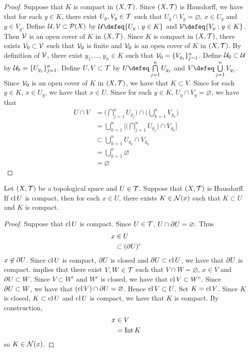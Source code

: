 \documentclass{book}
\begin{document}
	\begin{proof}
		Suppose that $K$ is compact in $(X, \mathcal{T})$. Since $(X, \mathcal{T})$ is Hausdorff, we have that for each $y \in K$, there exist $U_y, V_y \in \mathcal{T}$ such that $U_y \cap V_y = \varnothing$, $x \in U_y$ and $y \in V_y$. Define $\mathcal{U}, \mathcal{V} \subset \mathcal{P}(X)$ by $\MU \defeq \{U_y: y \in K\}$ and $\MV \defeq \{V_y: y \in K\}$. Then $\mathcal{V}$ is an open cover of $K$ in $(X, \mathcal{T})$. Since $K$ is compact in $(X, \mathcal{T})$, there exists $\mathcal{V}_0 \subset \mathcal{V}$ such that $\mathcal{V}_0$ is finite and $\mathcal{V}_0$ is an open cover of $K$ in $(X, \mathcal{T})$. By definition of $\mathcal{V}$, there exist $y_1, \ldots, y_n \in K$ such that $\mathcal{V}_0 = \{V_{y_j}\}_{j=1}^n$. Define $\mathcal{U}_0 \subset \mathcal{U}$ by $\mathcal{U}_0 = \{U_{y_j}\}_{j=1}^n$. Define $U,V \subset \mathcal{T}$ by $U \defeq \bigcap\limits_{j=1}^n U_{y_j}$ and $V \defeq \bigcup\limits_{j=1}^n V_{y_j}$. Since $\mathcal{V}_0$ is an open cover of $K$ in $(X, \mathcal{T})$, we have that $K \subset V$. Since for each $y \in K$, $x \in U_y$, we have that $x \in U$. Since for each $y \in K$, $U_y \cap V_y = \varnothing$, we have that 
		\begin{align*}
			U \cap V
			& = \bigg( \bigcap_{j=1}^n U_{y_j} \bigg) \cap  \bigg( \bigcup_{k=1}^n V_{y_k} \bigg) \\
			& = \bigcup_{k=1}^n \bigg[ \bigg(  \bigcap_{j=1}^n U_{y_j} \bigg) \cap V_{y_k}  \bigg] \\
			& \subset \bigcup_{k=1}^n U_{y_k} \cap V_{y_k} \\
			& = \bigcup_{k=1}^n \varnothing \\
			& = \varnothing
		\end{align*}
	\end{proof}
	
	\begin{ex} 
		Let $(X, \mathcal{T})$ be a topological space and $U \in \mathcal{T}$. Suppose that $(X, \mathcal{T})$ is Hausdorff. If $\operatorname{cl} U$ is compact, then for each $x \in U$, there exists $K \in \mathcal{N}(x)$ such that $K \subset U$ and $K$ is compact.   
	\end{ex}

	\begin{proof}
		Suppose that $\operatorname{cl} U$ is compact. Since $U \in \mathcal{T}$, $U \cap \partial U = \varnothing$. Thus  
		\begin{align*}
			x 
			& \in U \\
			& \subset (\partial U)^c 
		\end{align*}
		$x \not \in \partial U$. Since $\operatorname{cl} U$ is compact, $\partial U$ is closed and $\partial U \subset \operatorname{cl} U$, we have that $\partial U$ is compact.  implies that there exist $V,W \in \mathcal{T}$ such that $V \cap W = \varnothing$, $x \in V$ and $\partial U \subset W$. Since $V \subset W^c$ and $W^c$ is closed, we have that $\operatorname{cl} V \subset W^c$. Since $\partial U \subset W$, we have that $(\operatorname{cl} V) \cap \partial U = \varnothing$. Hence $\operatorname{cl} V \subset U$. Set $K = \operatorname{cl} V$. Since $K$ is closed, $K \subset \operatorname{cl} U$ and $\operatorname{cl} U$ is compact, we have that $K$ is compact. By construction,  
		\begin{align*}
			x 
			& \in V \\
			& = \operatorname{Int} K 
		\end{align*}
		so $K \in \mathcal{N}(x)$. 
	\end{proof}
\end{document}
